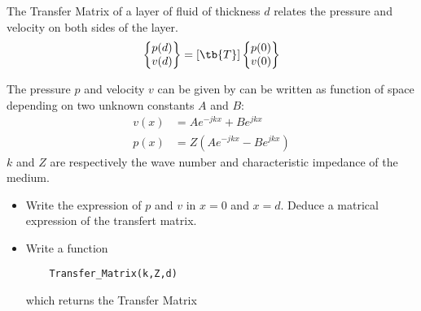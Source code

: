 \bexo


The Transfer Matrix of a layer of fluid of thickness $d$ relates the pressure and velocity on both sides of the layer. 
\begin{equation}
	\begin{Bmatrix}
		p(d)\\
		v(d)
	\end{Bmatrix}=[\tb{T}]	\begin{Bmatrix}
		p(0)\\
		v(0)
	\end{Bmatrix}
\end{equation}



The pressure $p$ and velocity $v$ can be given by can be written as function of space depending on two unknown constants $A$ and $B$:
\begin{align}
	v(x)&=A e^{-jkx}+B e^{jkx}\\
	p(x)&=Z(A e^{-jkx}-B e^{jkx})
\end{align}
$k$ and $Z$ are respectively the wave number and characteristic impedance of the medium. 
\begin{itemize}
	\item Write the expression of $p$ and $v$ in $x=0$ and $x=d$. Deduce a matrical expression of the transfert matrix.
	\item Write a function
\begin{verbatim}
	Transfer_Matrix(k,Z,d)
\end{verbatim}
which returns the Transfer Matrix

\end{itemize}



\eexo
\solution{
}
